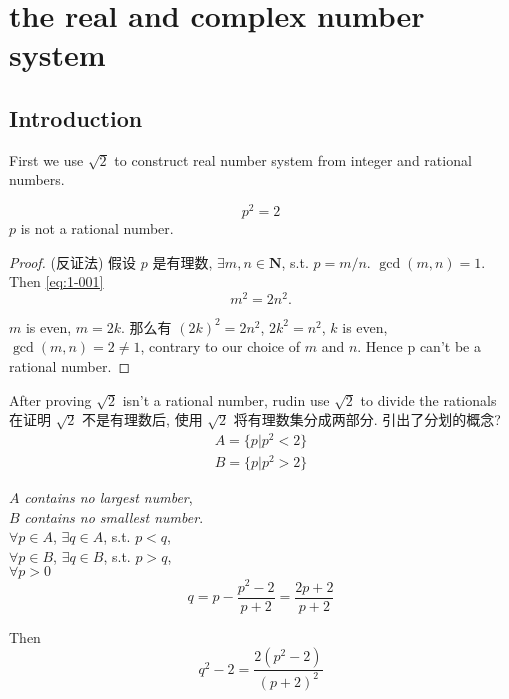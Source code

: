 \chapter{the real and complex number system}

\section{Introduction}
First we use $\sqrt{2}$ to construct real number system from integer and rational numbers.

\begin{myExample}\label{Example:1.1}
\begin{equation}\label{eq:1-001}
    p^2=2
\end{equation}
$p$ is not a rational number.
\end{myExample}

\begin{proof}
(反证法) 假设 $p$ 是有理数,  $\exists m,n \in \mathbf{N}$, s.t. $p=m/n$. $\gcd (m,n) = 1$.
Then \ref{eq:1-001}
\begin{equation}\label{eq:1-002}
    m^2 = 2n^2.
\end{equation}

$m$ is even, $m = 2k$.
那么有 $(2k)^2 = 2n^2$, $2k^2 = n^2$, $k$ is even, $\gcd (m,n)=2\neq 1$,
contrary to our choice of $m$ and $n$. Hence p can't be a rational number.
\end{proof}

After proving $\sqrt{2}$ isn't a rational number, rudin use $\sqrt{2}$ to divide the rationals
在证明 $\sqrt{2}$ 不是有理数后, 使用 $\sqrt{2}$ 将有理数集分成两部分.  引出了分划的概念? 
\begin{align*}
    A = \{p|p^2<2\}\\
    B = \{p|p^2>2\}
\end{align*}

$A$ \emph{contains no largest number},\\
$B$ \emph{contains no smallest number}.\\
$\forall p\in A$, $\exists q\in A$, s.t. $p<q$,\\
$\forall p\in B$, $\exists q\in B$, s.t. $p>q$,\\
$\forall p>0$
\begin{equation}\label{eq:1-003}
    q = p-\frac{p^2-2}{p+2} = \frac{2p+2}{p+2}
\end{equation}

Then 
\begin{equation}
    \label{eq:1-004}
    q^2 - 2 = \frac{2(p^2-2)}{(p+2)^2}
\end{equation}


